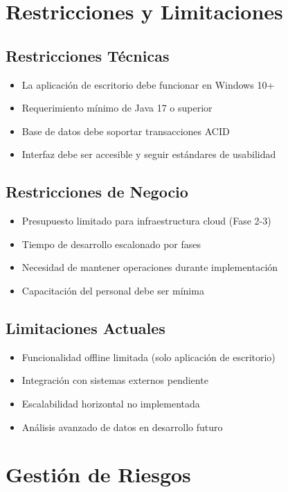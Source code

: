 \documentclass[12pt,letterpaper]{article}
\begin{document}
\section{Restricciones y Limitaciones}

\subsection{Restricciones Técnicas}
\begin{itemize}
    \item La aplicación de escritorio debe funcionar en Windows 10+
    \item Requerimiento mínimo de Java 17 o superior
    \item Base de datos debe soportar transacciones ACID
    \item Interfaz debe ser accesible y seguir estándares de usabilidad
\end{itemize}

\subsection{Restricciones de Negocio}
\begin{itemize}
    \item Presupuesto limitado para infraestructura cloud (Fase 2-3)
    \item Tiempo de desarrollo escalonado por fases
    \item Necesidad de mantener operaciones durante implementación
    \item Capacitación del personal debe ser mínima
\end{itemize}

\subsection{Limitaciones Actuales}
\begin{itemize}
    \item Funcionalidad offline limitada (solo aplicación de escritorio)
    \item Integración con sistemas externos pendiente
    \item Escalabilidad horizontal no implementada
    \item Análisis avanzado de datos en desarrollo futuro
\end{itemize}

\section{Gestión de Riesgos}
\end{document}
